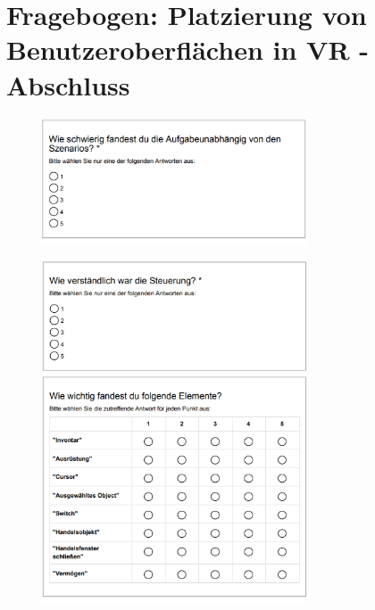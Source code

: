 
\chapter{Fragebogen: Platzierung von Benutzeroberflächen in VR - Abschluss}\label{chapter:fragen3}
	\begin{figure}[htbp]
		\centering
		\includegraphics[width=0.7\textwidth]{Fragen/1Ende.png}
	\end{figure}

	\begin{figure}[htbp]
		\centering
		\includegraphics[width=0.7\textwidth]{Fragen/2Ende.png}
	\end{figure}